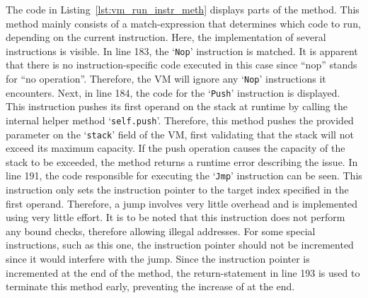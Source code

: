 
The code in Listing~\ref{lst:vm_run_instr_meth} displays parts of the  method.
This method mainly consists of a match-expression that determines which code to run, depending on the current instruction.
Here, the implementation of several instructions is visible.
In line 183, the `\texttt{Nop}' instruction is matched.
It is apparent that there is no instruction-specific code executed in this case since \enquote{nop} stands for \enquote{no operation}.
Therefore, the VM will ignore any `\texttt{Nop}' instructions it encounters.
Next, in line 184, the code for the `\texttt{Push}' instruction is displayed.
This instruction pushes its first operand on the stack at runtime by calling the internal helper method `\texttt{self.push}'.
Therefore, this method pushes the provided parameter on the `\texttt{stack}' field of the VM,
first validating that the stack will not exceed its maximum capacity.
If the push operation causes the capacity of the stack to be exceeded, the method returns a runtime error describing the issue.
In line 191, the code responsible for executing the `\texttt{Jmp}' instruction can be seen.
This instruction only sets the instruction pointer to the target index specified in the first operand.
Therefore, a jump involves very little overhead and is implemented using very little effort.
It is to be noted that this instruction does not perform any bound checks, therefore allowing illegal addresses.
For some special instructions, such as this one, the instruction pointer should not be incremented since it would interfere with the jump.
Since the instruction pointer is incremented at the end of the method, the return-statement in line 193 is used to terminate this method early, preventing the increase of  at the end.

